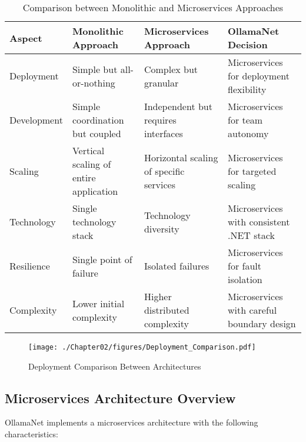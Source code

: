 \begin{table}[h]
  \centering
  \caption{Comparison between Monolithic and Microservices Approaches}
  \label{tab:mono-vs-micro}
  \begin{tabular}{|l|p{3.5cm}|p{3.5cm}|p{3.5cm}|}
    \hline
    \textbf{Aspect} & \textbf{Monolithic Approach} & \textbf{Microservices Approach} & \textbf{OllamaNet Decision} \\
    \hline
    Deployment & Simple but all-or-nothing & Complex but granular & Microservices for deployment flexibility \\
    \hline
    Development & Simple coordination but coupled & Independent but requires interfaces & Microservices for team autonomy \\
    \hline
    Scaling & Vertical scaling of entire application & Horizontal scaling of specific services & Microservices for targeted scaling \\
    \hline
    Technology & Single technology stack & Technology diversity & Microservices with consistent .NET stack \\
    \hline
    Resilience & Single point of failure & Isolated failures & Microservices for fault isolation \\
    \hline
    Complexity & Lower initial complexity & Higher distributed complexity & Microservices with careful boundary design \\
    \hline
  \end{tabular}
\end{table}

\begin{sidewaysfigure}[p]
    \centering
    \texttt{[image: ./Chapter02/figures/Deployment\_Comparison.pdf]}
    \caption{Deployment Comparison Between Architectures}
    \label{fig:deploy-comparison}
\end{sidewaysfigure}
\clearpage

\subsection{Microservices Architecture Overview}

OllamaNet implements a microservices architecture with the following characteristics:

